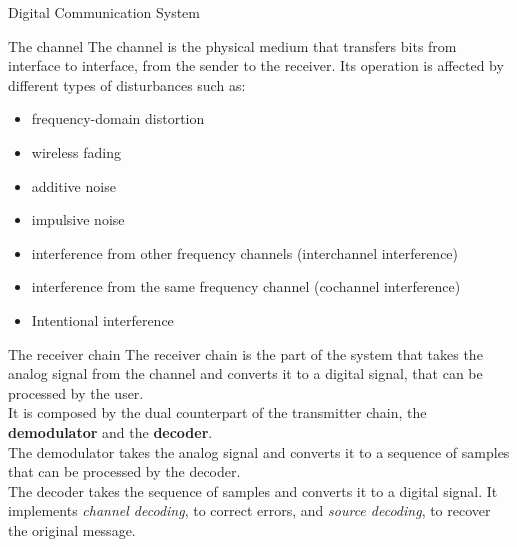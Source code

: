 \begin{section}{Digital Communication System}
\begin{subsection}{The channel}
  \label{subsec:channel}
The channel is the physical medium that transfers bits from interface to interface, from the sender
to the receiver.
Its operation is affected by different types of disturbances such as:
\begin{itemize}
	\item frequency-domain distortion
	\item wireless fading
	\item additive noise
	\item impulsive noise
	\item interference from other frequency channels (interchannel interference)
	\item interference from the same frequency channel (cochannel interference)
	\item Intentional interference
\end {itemize}
\end{subsection}
\begin{subsection}{The receiver chain}
The receiver chain is the part of the system that takes the analog signal from the channel and
converts it to a digital signal, that can be processed by the user.\\
It is composed by the dual counterpart of the transmitter chain, the \textbf{demodulator} and the
\textbf{decoder}. \\
The demodulator takes the analog signal and converts it to a sequence of samples that can be
processed by the decoder.\\
The decoder takes the sequence of samples and converts it to a digital signal. It implements
\textit{channel decoding}, to correct errors, and \textit{source decoding}, to recover the original
message.
\end{subsection}
\end{section}

